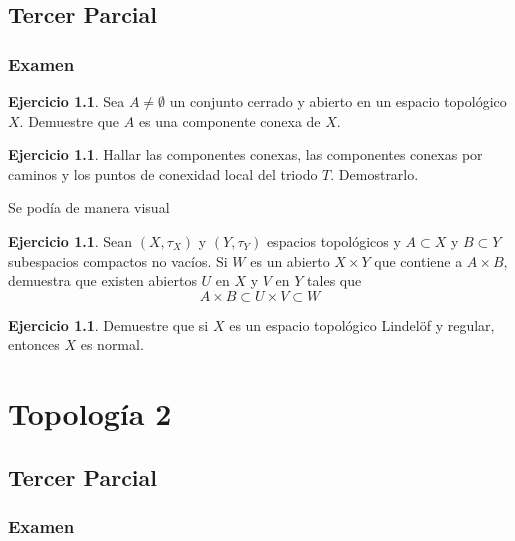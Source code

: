 \documentclass[11pt,a4paper,oneside]{report}
\theoremstyle{definition}
\newtheorem{ejercicio}[definicion]{Ejercicio}
\theoremstyle{plain}
\theoremstyle{remark}
\begin{document}
\chapter{Tercer Parcial}

\section{Examen}

\begin{ejercicio}
  Sea $A\not = \emptyset$ un conjunto cerrado y abierto en un espacio topológico $X$. Demuestre 
  que $A$ es una componente conexa de $X$.
\end{ejercicio}

\begin{ejercicio}
  Hallar las componentes conexas, las componentes conexas por caminos y los puntos de
  conexidad local del triodo $T$. Demostrarlo.
\end{ejercicio}
Se podía de manera visual

\begin{ejercicio}
  Sean $(X,\tau_X)$ y $(Y,\tau_Y)$ espacios topológicos y $A \subset X$ y $B \subset Y$
  subespacios compactos no vacíos. Si $W$ es un abierto $X \times Y$ que contiene a 
  $A \times B$, demuestra que existen abiertos $U$ en $X$ y $V$ en $Y$ tales que
  \[ A \times B \subset U \times V \subset W \]
\end{ejercicio}

\begin{ejercicio}
  Demuestre que si $X$ es un espacio topológico Lindelöf y regular, entonces $X$ es normal.
\end{ejercicio}

\part{Topología 2}

\chapter{Tercer Parcial}

\section{Examen}
\end{document}
